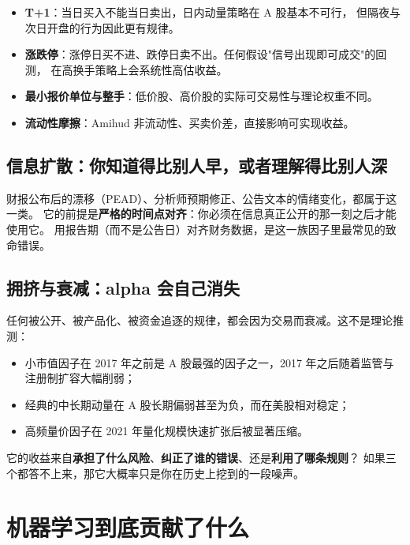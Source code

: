\begin{itemize}
  \item \textbf{T+1}：当日买入不能当日卖出，日内动量策略在 A 股基本不可行，
        但隔夜与次日开盘的行为因此更有规律。
  \item \textbf{涨跌停}：涨停日买不进、跌停日卖不出。任何假设"信号出现即可成交"的回测，
        在高换手策略上会系统性高估收益。
  \item \textbf{最小报价单位与整手}：低价股、高价股的实际可交易性与理论权重不同。
  \item \textbf{流动性摩擦}：Amihud 非流动性、买卖价差，直接影响可实现收益。
\end{itemize}

\subsection{信息扩散：你知道得比别人早，或者理解得比别人深}

财报公布后的漂移（PEAD）、分析师预期修正、公告文本的情绪变化，都属于这一类。
它的前提是\textbf{严格的时间点对齐}：你必须在信息真正公开的那一刻之后才能使用它。
用报告期（而不是公告日）对齐财务数据，是这一族因子里最常见的致命错误。

\subsection{拥挤与衰减：alpha 会自己消失}

任何被公开、被产品化、被资金追逐的规律，都会因为交易而衰减。这不是理论推测：

\begin{itemize}
  \item 小市值因子在 2017 年之前是 A 股最强的因子之一，2017 年之后随着监管与
        注册制扩容大幅削弱；
  \item 经典的中长期动量在 A 股长期偏弱甚至为负，而在美股相对稳定；
  \item 高频量价因子在 2021 年量化规模快速扩张后被显著压缩。
\end{itemize}

\begin{keybox}[判断一个因子能不能用的第一问]
它的收益来自\textbf{承担了什么风险}、\textbf{纠正了谁的错误}、还是\textbf{利用了哪条规则}？
如果三个都答不上来，那它大概率只是你在历史上挖到的一段噪声。
\end{keybox}

\section{机器学习到底贡献了什么}

